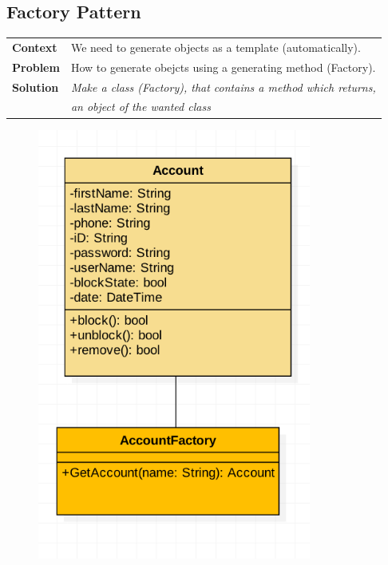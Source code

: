 \documentclass{article}
\begin{document}
\subsection{Factory Pattern}
    \begin{tabular}{ l | l }
    \toprule
      \rowcolor{LightCyan}
      \textbf{Context}            & We need to generate objects as a template (automatically).\\
      \textbf{Problem}            & How to generate obejcts using a generating method (Factory).\\
      \rowcolor{LightCyan}
      \textbf{Solution}           & \textit{Make a class (Factory), that contains a method which returns,}\\
                                  & \textit{an object of the wanted class}\\
    \toprule
    \end{tabular}
\begin{figure}[ht!]
\centering
\includegraphics[width=90mm]{Factory Design Pattern.png}
\end{figure}




\newpage
\end{document}
